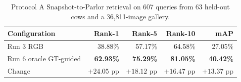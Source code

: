 \begin{table}[htbp]
\centering\small
\caption[Snapshot-to-Parlor Re-ID results]{Protocol A Snapshot-to-Parlor retrieval on 607 queries from 63 held-out cows and a 36,811-image gallery.}
\label{tab:reidsnapshot}
\begin{tabular}{lrrrr}
\toprule
Configuration & Rank-1 & Rank-5 & Rank-10 & mAP \\
\midrule
Run 3 RGB & 38.88\% & 57.17\% & 64.58\% & 27.05\% \\
Run 6 oracle GT-guided & \textbf{62.93\%} & \textbf{75.29\%} & \textbf{81.05\%} & \textbf{40.42\%} \\
Change & $+24.05$ pp & $+18.12$ pp & $+16.47$ pp & $+13.37$ pp \\
\bottomrule
\end{tabular}
\end{table}
